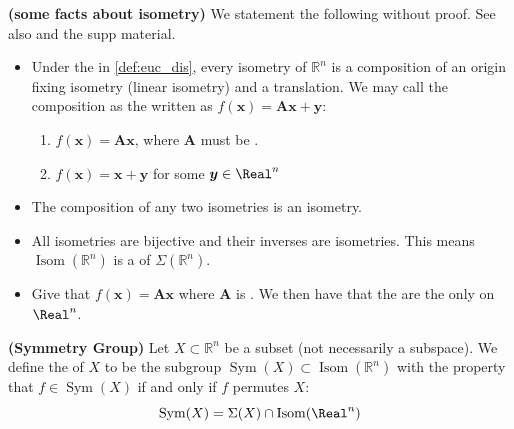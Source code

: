 \documentclass{article}
\newcommand{\bfs}[1]{\textbf{({#1}) }}
\newcommand{\Sym}{\operatorname{Sym}}
\newcommand{\Isom}{\operatorname{Isom}}
\begin{document}
\begin{rema}{\bfs{some facts about isometry}} We statement the following without proof. See also \cite[page 85 and 320 ]{horn2012matrix} and the supp material.
\begin{itemize}
    \item Under the  in \cref{def:euc_dis}, every isometry of $\mathbb{R}^{n}$ is a composition of an origin fixing isometry (linear isometry) and a translation. We may call the composition as the  written as $f(\boldsymbol{x})=\boldsymbol{A} \boldsymbol{x}+\boldsymbol{y}$:
    \begin{enumerate}
        \item {} $f(\boldsymbol{x})=\boldsymbol{A} \boldsymbol{x}$, where $\boldsymbol{A}$ must be .
        \item {} $f(\boldsymbol{x})= \boldsymbol{x}+\boldsymbol{y}$ for some $\boldsymbol{y}\in \Real^n$
    \end{enumerate}
    \item The composition of any two isometries is an isometry.
    \item All isometries are bijective and their inverses are isometries. This means $ \operatorname{Isom}\left(\mathbb{R}^{n}\right)$ is a  of $\Sigma\left(\mathbb{R}^{n}\right) .$
    \item Give that $f(\boldsymbol{x})=\boldsymbol{A} \boldsymbol{x}$ where $\boldsymbol{A}$ is . We then have that the  are the only  on $\Real^n$.
\end{itemize}
\end{rema}
\begin{defa}{\bfs{Symmetry Group}}
 Let $X \subset \mathbb{R}^{n}$ be a subset (not necessarily a subspace). We define the  of $X$ to be the subgroup $\operatorname{Sym}(X) \subset \operatorname{Isom}\left(\mathbb{R}^{n}\right)$ with the property that $f \in \operatorname{Sym}(X)$ if and only if $f$ permutes $X$:
 $$\Sym(X) = \Sigma(X)\cap \Isom(\Real^n) $$
\end{defa}
\end{document}
